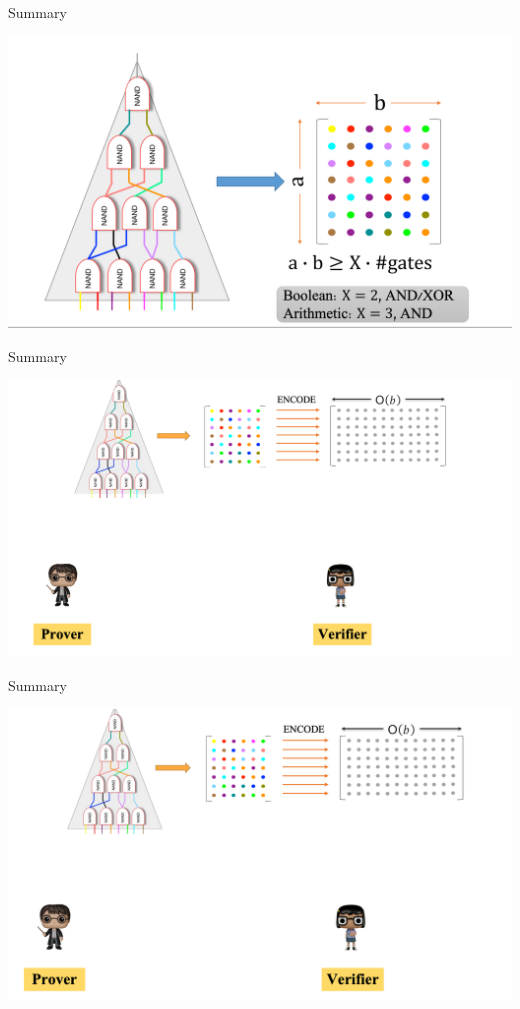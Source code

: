 \documentclass{beamer}
\begin{document}
\begin{frame}{Summary}
	\begin{minipage}{0.42\linewidth}
		\includegraphics[scale=0.26]{l3.png}
	\end{minipage}
\end{frame}

\begin{frame}{Summary}
	\begin{minipage}{0.42\linewidth}
		\includegraphics[scale=0.26]{l4.png}
	\end{minipage}
\end{frame}

\begin{frame}{Summary}
	\begin{minipage}{0.42\linewidth}
		\includegraphics[scale=0.26]{l5.png}
	\end{minipage}
\end{frame}
\end{document}

